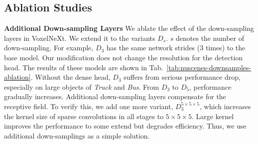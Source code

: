 \documentclass[10pt,twocolumn,letterpaper]{article}
\begin{document}
\subsection{Ablation Studies}
\noindent
\textbf{Additional Down-sampling Layers}
We ablate the effect of the down-sampling layers in VoxelNeXt.
We extend it to the variants $D_s$. $s$ denotes the number of down-sampling. For example, $D_3$ has the same network strides (3 times) to the base model. Our modification does not change the resolution for the detection head. 
The results of these models are shown in Tab.~\ref{tab:nuscenes-downsamples-ablation}. Without the dense head, $D_3$ suffers from serious performance drop, especially on large objects of {\em Truck} and {\em Bus}. From $D_3$ to $D_5$, performance gradually increases. Additional down-sampling layers compensate for the receptive field. To verify this, we add one more variant, $D_3^{5\times 5\times 5}$, which increases the kernel size of sparse convolutions in all stages to $5\times 5\times 5$. Large kernel improves the performance to some extend but degrades efficiency. 
Thus, we use additional down-samplings as a simple solution.
\end{document}
